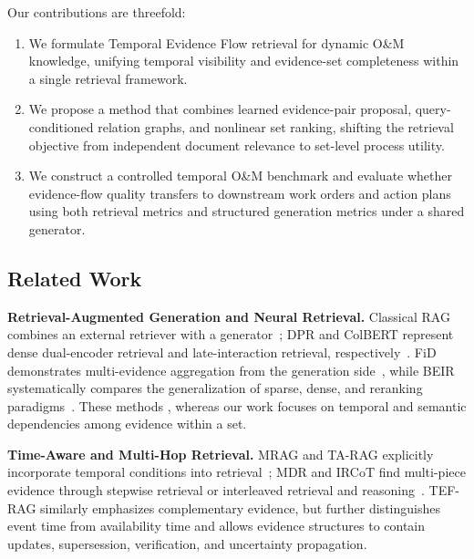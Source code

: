 Our contributions are threefold:
\begin{enumerate}
    \item We formulate Temporal Evidence Flow retrieval for dynamic O\&M knowledge, unifying temporal visibility and evidence-set completeness within a single retrieval framework.
    \item We propose a method that combines learned evidence-pair proposal, query-conditioned relation graphs, and nonlinear set ranking, shifting the retrieval objective from independent document relevance to set-level process utility.
    \item We construct a controlled temporal O\&M benchmark and evaluate whether evidence-flow quality transfers to downstream work orders and action plans using both retrieval metrics and structured generation metrics under a shared generator.
\end{enumerate}

\subsection{Related Work}
\label{sec:related_work}

\textbf{Retrieval-Augmented Generation and Neural Retrieval.}
Classical RAG combines an external retriever with a generator~\cite{lewis2020rag}; DPR and ColBERT represent dense dual-encoder retrieval and late-interaction retrieval, respectively~\cite{karpukhin2020dpr,khattab2020colbert}. FiD demonstrates multi-evidence aggregation from the generation side~\cite{izacard2021fid}, while BEIR systematically compares the generalization of sparse, dense, and reranking paradigms~\cite{thakur2021beir}. %
These methods , whereas our work focuses on temporal and semantic dependencies among evidence within a set.

\textbf{Time-Aware and Multi-Hop Retrieval.}
MRAG and TA-RAG explicitly incorporate temporal conditions into retrieval~\cite{zhang2025mrag,lau2025tarag}; MDR and IRCoT find multi-piece evidence through stepwise retrieval or interleaved retrieval and reasoning~\cite{xiong2021mdr,trivedi2023ircot}. TEF-RAG similarly emphasizes complementary evidence, but further distinguishes event time from availability time and allows evidence structures to contain updates, supersession, verification, and uncertainty propagation.

